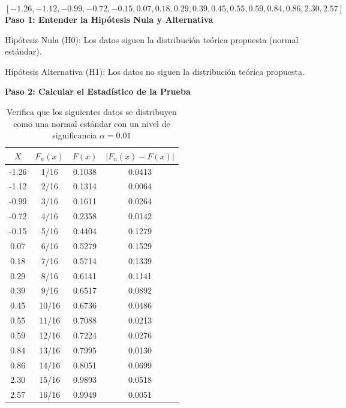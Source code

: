 \documentclass{article}
\begin{document}
\[ [-1.26, -1.12, -0.99, -0.72, -0.15, 0.07 , 0.18, 0.29, 0.39, 0.45, 0.55, 0.59, 0.84, 0.86, 2.30, 2.57]
\]
\textbf{Paso 1: Entender la Hipótesis Nula y Alternativa}

Hipótesis Nula (H0): Los datos siguen la distribución teórica propuesta (normal estándar).

Hipótesis Alternativa (H1): Los datos no siguen la distribución teórica propuesta.

\textbf{Paso 2: Calcular el Estadístico de la Prueba}

\begin{table}[ht]
    \centering
    \caption{Verifica que los siguientes datos se distribuyen como una normal estándar con un nivel de significancia $\alpha=0.01$}
    \begin{tabular}{cccc}
        \toprule
        \( X \) & \( F_n(x) \) & \( F(x) \) & \( |F_n(x) - F(x)| \) \\
        \midrule
        -1.26   & 1/16         & 0.1038     & 0.0413                \\
        -1.12   & 2/16         & 0.1314     & 0.0064                \\
        -0.99   & 3/16         & 0.1611     & 0.0264                \\
        -0.72   & 4/16         & 0.2358     & 0.0142                \\
        -0.15   & 5/16         & 0.4404     & 0.1279                \\
        0.07    & 6/16         & 0.5279     & 0.1529                \\
        0.18    & 7/16         & 0.5714     & 0.1339                \\
        0.29    & 8/16         & 0.6141     & 0.1141                \\
        0.39    & 9/16         & 0.6517     & 0.0892                \\
        0.45    & 10/16        & 0.6736     & 0.0486                \\
        0.55    & 11/16        & 0.7088     & 0.0213                \\
        0.59    & 12/16        & 0.7224     & 0.0276                \\
        0.84    & 13/16        & 0.7995     & 0.0130                \\
        0.86    & 14/16        & 0.8051     & 0.0699                \\
        2.30    & 15/16        & 0.9893     & 0.0518                \\
        2.57    & 16/16        & 0.9949     & 0.0051                \\
        \bottomrule
    \end{tabular}
\end{table}
\end{document}
